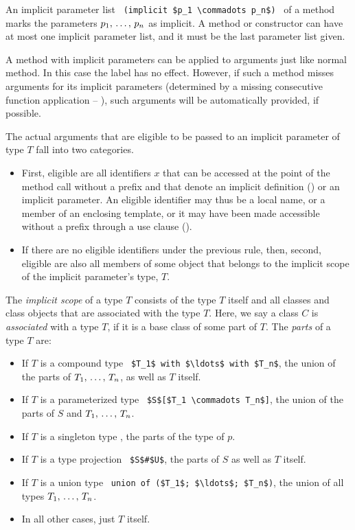 An implicit parameter list ~\lstinline!(implicit $p_1 \commadots p_n$)!~ of a method marks the parameters $p_1 ,\, \ldots ,\, p_n$ as implicit. A method or constructor can have at most one implicit parameter list, and it must be the last parameter list given. 

A method with implicit parameters can be applied to arguments just like normal method. In this case the  label has no effect. However, if such a method misses arguments for its implicit parameters (determined by a missing consecutive function application -- ), such arguments will be automatically provided, if possible. 

The actual arguments that are eligible to be passed to an implicit parameter of type $T$ fall into two categories.
\begin{itemize}
\item First, eligible are all identifiers $x$ that can be accessed at the point of the method call without a prefix and that denote an implicit definition () or an implicit parameter. An eligible identifier may thus be a local name, or a member of an enclosing template, or it may have been made accessible without a prefix through a use clause (). 
\item If there are no eligible identifiers under the previous rule, then, second, eligible are also all  members of some object that belongs to the implicit scope of the implicit parameter's type, $T$. 
\end{itemize}

The {\em implicit scope} of a type $T$ consists of the type $T$ itself and all classes and class objects that are associated with the type $T$. Here, we say a class $C$ is {\em associated} with a type $T$, if it is a base class of some part of $T$. The {\em parts} of a type $T$ are:
\begin{itemize}
\item If $T$ is a compound type ~\lstinline!$T_1$ with $\ldots$ with $T_n$!, the union of the parts of $T_1 ,\, \ldots ,\, T_n$, as well as $T$ itself.
\item If $T$ is a parameterized type ~\lstinline!$S$[$T_1 \commadots T_n$]!, the union of the parts of $S$ and $T_1 ,\, \ldots ,\, T_n$. 
\item If $T$ is a singleton type , the parts of the type of $p$. 
\item If $T$ is a type projection ~\lstinline!$S$#$U$!, the parts of $S$ as well as $T$ itself.
\item If $T$ is a union type ~\lstinline!union of ($T_1$; $\ldots$; $T_n$)!, the union of all types $T_1 ,\, \ldots ,\, T_n$. 
\item In all other cases, just $T$ itself. 
\end{itemize}

